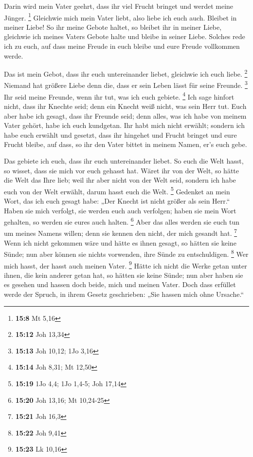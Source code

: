  Darin wird mein Vater geehrt, dass ihr viel Frucht
bringet und werdet meine Jünger. \footnote{\textbf{15:8} Mt 5,16}
 Gleichwie mich mein Vater liebt, also liebe ich euch
auch. Bleibet in meiner Liebe!  So ihr meine Gebote
haltet, so bleibet ihr in meiner Liebe, gleichwie ich meines Vaters
Gebote halte und bleibe in seiner Liebe.  Solches rede
ich zu euch, auf dass meine Freude in euch bleibe und eure Freude
vollkommen werde.

 Das ist mein Gebot, dass ihr euch untereinander liebet,
gleichwie ich euch liebe. \footnote{\textbf{15:12} Joh 13,34}
 Niemand hat größere Liebe denn die, dass er sein Leben
lässt für seine Freunde. \footnote{\textbf{15:13} Joh 10,12; 1Jo 3,16}
 Ihr seid meine Freunde, wenn ihr tut, was ich euch
gebiete. \footnote{\textbf{15:14} Joh 8,31; Mt 12,50} 
Ich sage hinfort nicht, dass ihr Knechte seid; denn ein Knecht weiß
nicht, was sein Herr tut. Euch aber habe ich gesagt, dass ihr Freunde
seid; denn alles, was ich habe von meinem Vater gehört, habe ich euch
kundgetan.  Ihr habt mich nicht erwählt; sondern ich habe
euch erwählt und gesetzt, dass ihr hingehet und Frucht bringet und eure
Frucht bleibe, auf dass, so ihr den Vater bittet in meinem Namen, er's
euch gebe.

 Das gebiete ich euch, dass ihr euch untereinander
liebet.  So euch die Welt hasst, so wisset, dass sie mich
vor euch gehasst hat.  Wäret ihr von der Welt, so hätte
die Welt das Ihre lieb; weil ihr aber nicht von der Welt seid, sondern
ich habe euch von der Welt erwählt, darum hasst euch die Welt.
\footnote{\textbf{15:19} 1Jo 4,4; 1Jo 1,4-5; Joh 17,14} 
Gedenket an mein Wort, das ich euch gesagt habe: „Der Knecht ist nicht
größer als sein Herr.`` Haben sie mich verfolgt, sie werden euch auch
verfolgen; haben sie mein Wort gehalten, so werden sie eures auch
halten. \footnote{\textbf{15:20} Joh 13,16; Mt 10,24-25} 
Aber das alles werden sie euch tun um meines Namens willen; denn sie
kennen den nicht, der mich gesandt hat. \footnote{\textbf{15:21} Joh
  16,3}  Wenn ich nicht gekommen wäre und hätte es ihnen
gesagt, so hätten sie keine Sünde; nun aber können sie nichts vorwenden,
ihre Sünde zu entschuldigen. \footnote{\textbf{15:22} Joh 9,41}
 Wer mich hasst, der hasst auch meinen Vater. \footnote{\textbf{15:23}
  Lk 10,16}  Hätte ich nicht die Werke getan unter ihnen,
die kein anderer getan hat, so hätten sie keine Sünde; nun aber haben
sie es gesehen und hassen doch beide, mich und meinen Vater.
 Doch dass erfüllet werde der Spruch, in ihrem Gesetz
geschrieben: „Sie hassen mich ohne Ursache.``

